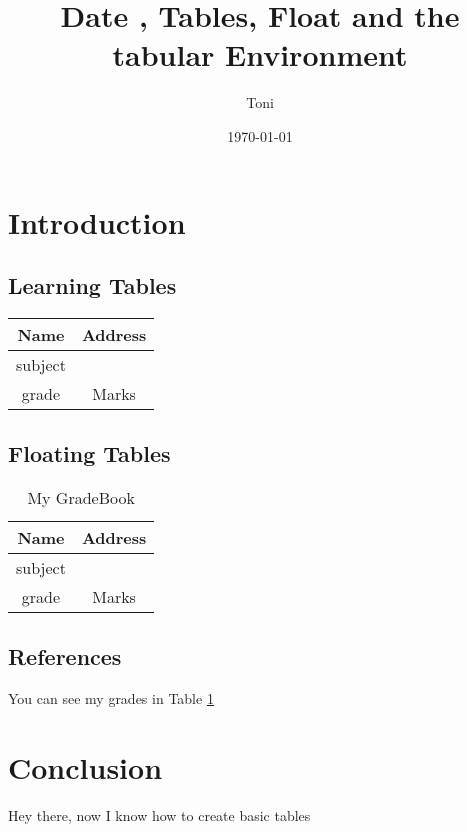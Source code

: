 \documentclass{article}
\begin{document}
\title {Date , Tables, Float and the tabular Environment}
\author{Toni}
\date{\today} 


\section{Introduction}

\subsection{Learning Tables}
\begin{tabular}{|c|c|}
\hline \hline
Name & Address \\
\hline
subject  & \\
\hline 
grade & Marks \\
\hline \hline
\end{tabular}


\subsection{Floating Tables}
\begin{table}[htbp]
\caption{My GradeBook}
\begin{center}

\begin{tabular}{|c|c|}
\hline 
Name & Address \\
\hline
subject  & \\
\hline 
grade & Marks \\
\hline 
\end{tabular}

\end{center}
\label{tab:grades}
\end{table}

\subsection{References}

You can see my grades in Table \ref{tab:grades}

\section{Conclusion}
Hey there, now I know how to create basic tables
\end{document}
